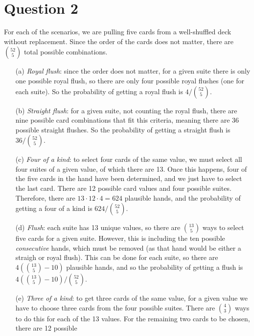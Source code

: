 \documentclass[10pt]{article}
\begin{document}
\section{Question 2} \noindent
For each of the scenarios, we are pulling five cards from a well-shuffled deck without replacement. Since the order of the cards does 
not matter, there are \(\binom{52}{5}\) total possible combinations. 
\begin{itemize}
    \item[(a)] \textsl{Royal flush}: since the order does not matter, for a given suite there is only one possible royal flush, so there are 
    only four possible royal flushes (one for each suite). So the probability of getting a royal flush is \(4 / \binom{52}{5}\).
    \item[(b)] \textsl{Straight flush}: for a given suite, not counting the royal flush, there are nine possible card combinations that fit 
    this criteria, meaning there are 36 possible straight flushes. So the probability of getting a straight flush is \(36 / \binom{52}{5}\).
    \item[(c)] \textsl{Four of a kind}: to select four cards of the same value, we must select all four suites of a given value, of which there
    are 13. Once this happens, four of the five cards in the hand have been determined, and we just have to select the last card. There are 12 
    possible card values and four possible suites. Therefore, there are \(13\cdot12\cdot4 = 624\) plausible hands, and the probability of getting 
    a four of a kind is \(624 / \binom{52}{5}\).
    \item[(d)] \textsl{Flush}: each suite has 13 unique values, so there are \(\binom{13}{5}\) ways to select five cards for a given suite. 
    However, this is including the ten possible \textit{consecutive} hands, which must be removed (as that hand would be either a straigh or 
    royal flush). This can be done for each suite, so there are \(4 \left( \binom{13}{5} - 10 \right)\) plausible hands, and so the probability 
    of getting a flush is \(4 \left( \binom{13}{5} - 10 \right) / \binom{52}{5}\).
    \item[(e)] \textsl{Three of a kind}: to get three cards of the same value, for a given value we have to choose three cards from the four possible
    suites. There are \(\binom{4}{3}\) ways to do this for each of the 13 values. For the remaining two cards to be chosen, there are 12 possible 

\end{itemize}
\end{document}
